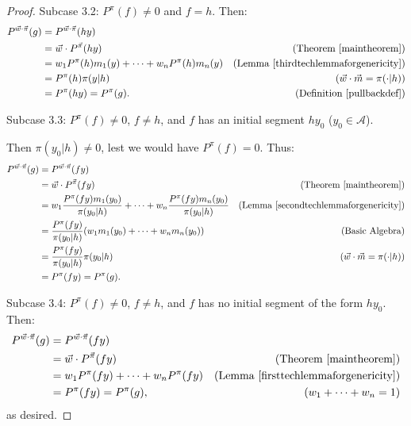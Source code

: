 \documentclass[twoside]{article}
\begin{document}
\begin{proof}
    Subcase 3.2: $P^\pi(f)\not=0$ and $f=h$. Then:
    \begin{align*}
        P^{\vec w\cdot\vec\pi}(g)
            &= P^{\vec w\cdot\vec\pi}(hy)\\
            &= \vec w\cdot{P^{\vec\pi}}(hy)
                    &\mbox{(Theorem \ref{maintheorem})}\\
            &= w_1P^\pi(h)m_1(y)+\cdots+w_nP^\pi(h)m_n(y)
                    &\mbox{(Lemma \ref{thirdtechlemmaforgenericity})}\\
            &= P^\pi(h)\pi(y|h)
                    &\mbox{($\vec w\cdot\vec m=\pi(\cdot|h)$)}\\
            &= P^\pi(hy) = P^\pi(g).
                    &\mbox{(Definition \ref{pullbackdef})}
    \end{align*}

    Subcase 3.3: $P^\pi(f)\not=0$, $f\not=h$, and
    $f$ has an initial segment $h y_0$ ($y_0\in\mathcal A$).

    Then $\pi(y_0|h)\not=0$, lest
    we would have $P^\pi(f)=0$. Thus:
    \begin{align*}
        P^{\vec w\cdot\vec\pi}(g)
            &= P^{\vec w\cdot \vec\pi}(fy)\\
            &= \vec w\cdot{P^{\vec\pi}}(fy)
                    &\mbox{(Theorem \ref{maintheorem})}\\
            &= w_1\frac{P^\pi(fy)m_1(y_0)}{\pi(y_0|h)}
                +\cdots+w_n\frac{P^\pi(fy)m_n(y_0)}{\pi(y_0|h)}
                    &\mbox{(Lemma \ref{secondtechlemmaforgenericity})}\\
            &= \frac{P^\pi(fy)}{\pi(y_0|h)}(w_1m_1(y_0)+\cdots+w_nm_n(y_0))
                    &\mbox{(Basic Algebra)}\\
            &= \frac{P^\pi(fy)}{\pi(y_0|h)}\pi(y_0|h)
                    &\mbox{($\vec w\cdot\vec m=\pi(\cdot|h)$)}\\
            &= P^\pi(fy) = P^\pi(g).
    \end{align*}

    Subcase 3.4: $P^\pi(f)\not=0$, $f\not=h$, and $f$ has no initial segment
        of the form $hy_0$. Then:
    \begin{align*}
        P^{\vec w\cdot\vec\pi}(g)
            &= P^{\vec w\cdot\vec\pi}(fy)\\
            &= \vec w\cdot{P^{\vec\pi}}(fy)
                    &\mbox{(Theorem \ref{maintheorem})}\\
            &= w_1P^\pi(fy)+\cdots+w_nP^\pi(fy)
                    &\mbox{(Lemma \ref{firsttechlemmaforgenericity})}\\
            &= P^\pi(fy) = P^\pi(g),
                    &\mbox{($w_1+\cdots+w_n=1$)}
    \end{align*}
    as desired.
\end{proof}
\end{document}
